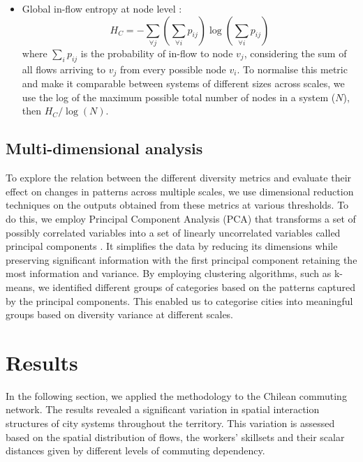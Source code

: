 \documentclass[11pt, a4paper]{article}
\begin{document}
\begin{itemize}
\item Global in-flow entropy at node level \citep{Marin2022}:
\begin{equation}
  H_{C}= -\sum_{\forall j} \left(\sum_{\forall i} p_{ij}\right)  \log  \left(\sum_{\forall i} p_{ij}\right)
\end{equation} 
where $\sum_{i} p_{ij}$ is the probability of in-flow to node $v_{j}$, considering the sum of all flows arriving to $v_{j}$ from every possible node $v_{i}$. To normalise this metric and make it comparable between systems of different sizes across scales, we use the log of the maximum possible total number of nodes in a system ($N$), then $H_{C}/\log(N)$.
\end{itemize}


\subsection{Multi-dimensional analysis}

To explore the relation between the different diversity metrics and evaluate their effect on changes in patterns across multiple scales, we use dimensional reduction techniques on the outputs obtained from these metrics at various thresholds. To do this, we employ Principal Component Analysis (PCA) that transforms a set of possibly correlated variables into a set of linearly uncorrelated variables called principal components \citep{pearson1901}. It simplifies the data by reducing its dimensions while preserving significant information with the first principal component retaining the most information and variance. By employing clustering algorithms, such as k-means, we identified different groups of categories based on the patterns captured by the principal components. This enabled us to categorise cities into meaningful groups based on diversity variance at different scales.



\section{Results}

In the following section, we applied the methodology to the Chilean commuting network. The results revealed a significant variation in spatial interaction structures of city systems throughout the territory. This variation is assessed based on the spatial distribution of flows, the workers' skillsets and their scalar distances given by different levels of commuting dependency.
\end{document}
